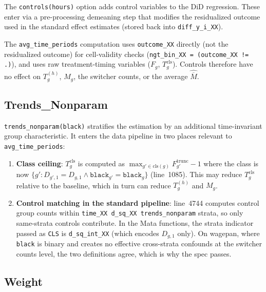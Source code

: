 \documentclass[11pt]{article}
\begin{document}
The \texttt{controls(hours)} option adds control variables to the DiD regression.
These enter via a pre-processing demeaning step that modifies the residualized
outcome used in the standard effect estimates (stored back into
\texttt{diff\_y\_i\_XX}).

The \texttt{avg\_time\_periods} computation uses \texttt{outcome\_XX} directly
(not the residualized outcome) for cell-validity checks
(\texttt{ngt\_bin\_XX = (outcome\_XX != .)}), and uses raw treatment-timing
variables ($F_g$, $T_g^{\text{cls}}$). Controls therefore have no effect on
$T_g^{(h)}$, $M_g$, the switcher counts, or the average $\widehat{\overline{M}}$.

\subsection{Trends\_Nonparam}

\texttt{trends\_nonparam(black)} stratifies the estimation by an additional
time-invariant group characteristic. It enters the data pipeline in two places
relevant to \texttt{avg\_time\_periods}:

\begin{enumerate}[nosep]
  \item \textbf{Class ceiling}: $T_g^{\text{cls}}$ is computed as
        $\max_{g' \in \text{cls}(g)} F_{g'}^{\text{trunc}} - 1$ where the class
        is now $\{g' : D_{g',1} = D_{g,1} \wedge \texttt{black}_{g'} = \texttt{black}_g\}$
        (line~1085). This may reduce $T_g^{\text{cls}}$ relative to the
        baseline, which in turn can reduce $T_g^{(h)}$ and $M_g$.

  \item \textbf{Control matching in the standard pipeline}: line~4744 computes
        control group counts within \texttt{time\_XX d\_sq\_XX trends\_nonparam}
        strata, so only same-strata controls contribute. In the Mata functions,
        the strata indicator passed as \texttt{CLS} is \texttt{d\_sq\_int\_XX}
        (which encodes $D_{g,1}$ only). On wagepan, where \texttt{black} is
        binary and creates no effective cross-strata confounds at the switcher
        counts level, the two definitions agree, which is why the spec passes.
\end{enumerate}

\subsection{Weight}
\end{document}

